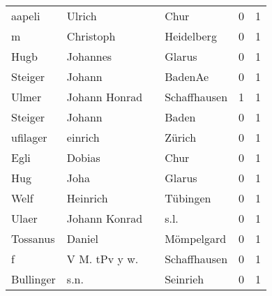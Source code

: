 \begin{center}
\begin{tiny}
\begin{longtabu}{llllrr}
                   aapeli &                             Ulrich &             &                                        Chur &          0 &         1 \\
                        m &                          Christoph &             &                                  Heidelberg &          0 &         1 \\
                     Hugb &                           Johannes &             &                                      Glarus &          0 &         1 \\
                  Steiger &                             Johann &             &                                     BadenAe &          0 &         1 \\
                    Ulmer &                      Johann Honrad &             &                                Schaffhausen &          1 &         1 \\
                  Steiger &                             Johann &             &                                       Baden &          0 &         1 \\
                 ufilager &                            einrich &             &                                      Zürich &          0 &         1 \\
                     Egli &                             Dobias &             &                                        Chur &          0 &         1 \\
                      Hug &                               Joha &             &                                      Glarus &          0 &         1 \\
                     Welf &                           Heinrich &             &                                    Tübingen &          0 &         1 \\
                    Ulaer &                      Johann Konrad &             &                                        s.l. &          0 &         1 \\
                 Tossanus &                             Daniel &             &                                  Mömpelgard &          0 &         1 \\
                        f &                      V M. tPv y w. &             &                                Schaffhausen &          0 &         1 \\
                Bullinger &                               s.n. &             &                                    Seinrieh &          0 &         1 \\

\end{longtabu}
\end{tiny}
\end{center}
